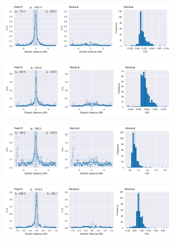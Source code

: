 \documentclass[a4paper,11pt,abstracton,hidelinks]{scrartcl}
\begin{document}
\begin{figure}[t!]
    \centering
    \begin{subfigure}[t]{0.32\textwidth}
        \centering
        \caption{}
        \includegraphics[width=1.1\textwidth,center,trim=0 27 380 0, clip]{artwork/chapter5/peak_fit_h12_cyp6p_ugs.png}
    \end{subfigure}
    \hfill
    \begin{subfigure}[t]{0.32\textwidth}
        \centering
        \caption{}
        \includegraphics[width=1.1\textwidth,center,trim=0 27 380 0, clip]{artwork/chapter5/peak_fit_h12_cyp6p_bfs.png}
    \end{subfigure}
    \hfill
    \begin{subfigure}[t]{0.32\textwidth}
        \centering
        \caption{}
        \includegraphics[width=1.1\textwidth,center,trim=0 27 380 0, clip]{artwork/chapter5/peak_fit_h12_cyp6p_bfm.png}
    \end{subfigure}
    \vspace{0cm}
    \begin{subfigure}[t]{0.32\textwidth}
        \centering
        \caption{}
        \includegraphics[width=1.1\textwidth,center,trim=0 27 380 0, clip]{artwork/chapter5/peak_fit_h12_gste_cms.png}

\end{subfigure}
\end{figure}
\end{document}
